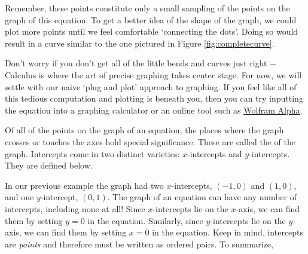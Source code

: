 {Remember, these points constitute only a small sampling of the points on the graph of this equation.  To get a better idea of the shape of the graph, we could plot more points until we feel comfortable `connecting the dots'.  Doing so would result in a curve similar to the one pictured in Figure \ref{fig:completecurve}.

\medskip



Don't worry if you don't get all of the little bends and curves just right $-$ Calculus is where the art of precise graphing takes center stage.  For now, we will settle with our naive `plug and plot' approach to graphing.  If you feel like all of this tedious computation and plotting is beneath you, then you can try inputting the equation into a graphing calculator or an online tool such as \href{http://www.wolframalpha.com/}{Wolfram Alpha}.
}

\medskip

Of all of the points on the graph of an equation, the places where the graph crosses or touches the axes hold special significance.  These are called the   of the graph.  Intercepts come in two distinct varieties: $x$-intercepts and $y$-intercepts.  They are defined below.

\smallskip



\smallskip

In our previous example the graph had two $x$-intercepts, $(-1,0)$ and $(1,0)$, and one $y$-intercept, $(0,1)$.  The graph of an equation can have any number of intercepts, including none at all!  Since $x$-intercepts lie on the $x$-axis, we can find them by setting $y = 0$ in the equation.  Similarly, since $y$-intercepts lie on the $y$-axis, we can find them by setting $x = 0$ in the equation.  Keep in mind, intercepts are \emph{points} and therefore must be written as ordered pairs.  To summarize,

